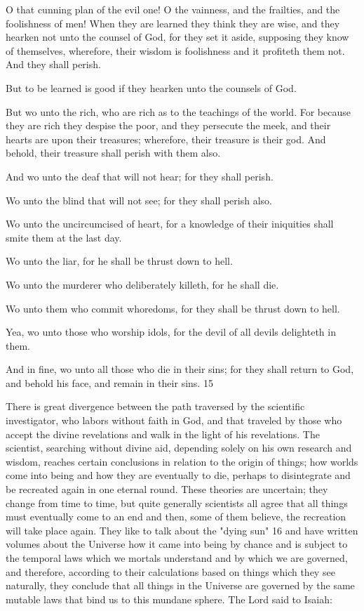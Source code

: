 O that cunning plan of the evil one! O the vainness, and the frailties, and the foolishness of
men! When they are learned they think they are wise, and they hearken not unto the counsel
of God, for they set it aside, supposing they know of themselves, wherefore, their wisdom is
foolishness and it profiteth them not. And they shall perish.

But to be learned is good if they hearken unto the counsels of God.

But wo unto the rich, who are rich as to the teachings of the world. For because they are rich
they despise the poor, and they persecute the meek, and their hearts are upon their treasures;
wherefore, their treasure is their god. And behold, their treasure shall perish with them also.

And wo unto the deaf that will not hear; for they shall perish.

Wo unto the blind that will not see; for they shall perish also.

Wo unto the uncircumcised of heart, for a knowledge of their iniquities shall smite them at
the last day.

Wo unto the liar, for he shall be thrust down to hell.

Wo unto the murderer who deliberately killeth, for he shall die.

Wo unto them who commit whoredoms, for they shall be thrust down to hell.

Yea, wo unto those who worship idols, for the devil of all devils delighteth in them.

And in fine, wo unto all those who die in their sins; for they shall return to God, and behold
his face, and remain in their sins. 15

There is great divergence between the path traversed by the scientific investigator, who
labors without faith in God, and that traveled by those who accept the divine revelations and
walk in the light of his revelations. The scientist, searching without divine aid, depending
solely on his own research and wisdom, reaches certain conclusions in relation to the origin
of things; how worlds come into being and how they are eventually to die, perhaps to
disintegrate and be recreated again in one eternal round. These theories are uncertain; they
change from time to time, but quite generally scientists all agree that all things must
eventually come to an end and then, some of them believe, the recreation will take place
again. They like to talk about the "dying sun" 16 and have written volumes about the
Universe how it came into being by chance and is subject to the temporal laws which we
mortals understand and by which we are governed, and therefore, according to their
calculations based on things which they see naturally, they conclude that all things in the
Universe are governed by the same mutable laws that bind us to this mundane sphere. The
Lord said to Isaiah:

